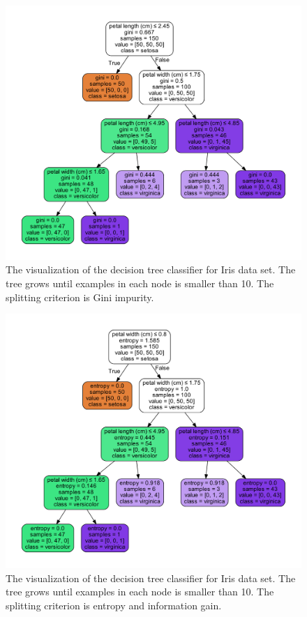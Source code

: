 \begin{refsection}
\begin{figure}[H]
	\centering
	\includegraphics[width=0.7\linewidth]{../figures/statisticalLearning/treeMethods/IrisDecisionTree_minSamplesGini}
	\caption{The visualization of the decision tree classifier for Iris data set. The tree grows until examples in each node is smaller than 10. The splitting criterion is Gini impurity.}
	\label{fig:irisdecisiontreeminsamplesgini}
\end{figure}

\begin{figure}[H]
	\centering
	\includegraphics[width=0.7\linewidth]{../figures/statisticalLearning/treeMethods/IrisDecisionTree_minSamplesEntropy}
	\caption{The visualization of the decision tree classifier for Iris data set. The tree grows until examples in each node is smaller than 10. The splitting criterion is entropy and information gain.}
	\label{fig:irisdecisiontreeminsamplesentropy}
\end{figure}




\end{refsection}
